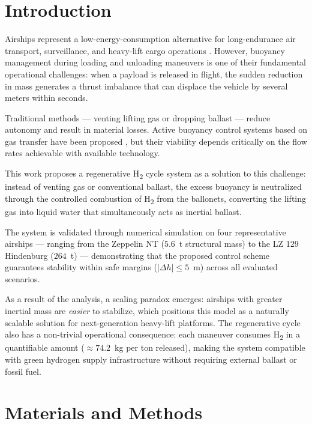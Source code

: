 \documentclass[aerospace,article,submit,pdftex,moreauthors]{Definitions/mdpi}
\begin{document}
\section{Introduction}

Airships represent a low-energy-consumption alternative for long-endurance air transport, surveillance, and heavy-lift cargo operations \cite{ref1,ref2,ref4,ref5}. However, buoyancy management during loading and unloading maneuvers is one of their fundamental operational challenges: when a payload is released in flight, the sudden reduction in mass generates a thrust imbalance that can displace the vehicle by several meters within seconds.

Traditional methods — venting lifting gas or dropping ballast — reduce autonomy and result in material losses. Active buoyancy control systems based on gas transfer have been proposed \cite{ref2}, but their viability depends critically on the flow rates achievable with available technology.

This work proposes a regenerative H\textsubscript{2} cycle system as a solution to this challenge: instead of venting gas or conventional ballast, the excess buoyancy is neutralized through the controlled combustion of H\textsubscript{2} from the ballonets, converting the lifting gas into liquid water that simultaneously acts as inertial ballast.

The system is validated through numerical simulation on four representative airships — ranging from the Zeppelin NT ($5.6$~t structural mass) to the LZ 129 Hindenburg ($264$~t) — demonstrating that the proposed control scheme guarantees stability within safe margins ($|\Delta h| \leq 5$~m) across all evaluated scenarios.

As a result of the analysis, a scaling paradox emerges: airships with greater inertial mass are \emph{easier} to stabilize, which positions this model as a naturally scalable solution for next-generation heavy-lift platforms. The regenerative cycle also has a non-trivial operational consequence: each maneuver consumes H\textsubscript{2} in a quantifiable amount (${\approx}74.2$~kg per ton released), making the system compatible with green hydrogen supply infrastructure without requiring external ballast or fossil fuel.

\section{Materials and Methods}
\end{document}
